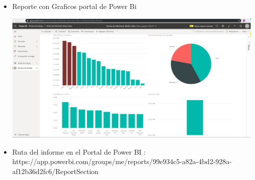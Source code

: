 \begin{itemize}
	\item Reporte con Graficos portal de Power Bi 
	\begin{center}
	\includegraphics[width=13cm]{./Imagenes/Captura6} 
	\end{center}
\end{itemize} 
\begin{itemize}
	\item  Ruta del informe en el Portal de Power BI :
	\textbf{} \\
	https://app.powerbi.com/groups/me/reports/99e934c5-a82a-4bd2-928a-af12b36d2fc6/ReportSection
\end{itemize} 

